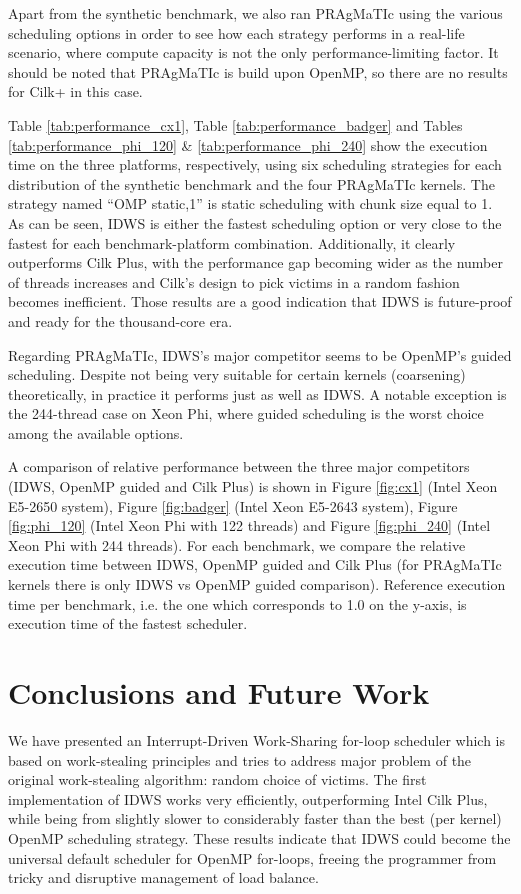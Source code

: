 \documentclass{acm_proc_article-sp}
\newcommand{\PRAGMATIC}{PRAgMaTIc\xspace}
\begin{document}
Apart from the synthetic benchmark, we also ran \PRAGMATIC using the various
scheduling options in order to see how each strategy performs in a real-life
scenario, where compute capacity is not the only performance-limiting factor. It
should be noted that \PRAGMATIC is build upon OpenMP, so there are no results
for Cilk+ in this case.

Table \ref{tab:performance_cx1}, Table \ref{tab:performance_badger} and
Tables \ref{tab:performance_phi_120} \& \ref{tab:performance_phi_240} show the
execution time on the three platforms, respectively, using six scheduling
strategies for each distribution of the synthetic benchmark and the four
\PRAGMATIC kernels. The strategy named ``OMP static,1'' is static scheduling
with chunk size equal to 1. As can be seen, IDWS is either the fastest
scheduling option or very close to the fastest for each benchmark-platform
combination. Additionally, it clearly outperforms Cilk Plus, with the
performance gap becoming wider as the number of threads increases and Cilk's
design to pick victims in a random fashion becomes inefficient. Those results
are a good indication that IDWS is future-proof and ready for the thousand-core
era.

Regarding \PRAGMATIC, IDWS's major competitor seems to be OpenMP's guided
scheduling. Despite not being very suitable for certain kernels (coarsening)
theoretically, in practice it performs just as well as IDWS. A notable exception
is the 244-thread case on Xeon Phi, where guided scheduling is the worst choice
among the available options.

A comparison of relative performance between the three major competitors (IDWS,
OpenMP guided and Cilk Plus) is shown in Figure \ref{fig:cx1} (Intel Xeon
E5-2650 system), Figure \ref{fig:badger} (Intel Xeon E5-2643 system), Figure
\ref{fig:phi_120} (Intel Xeon Phi with 122 threads) and Figure
\ref{fig:phi_240} (Intel Xeon Phi with 244 threads). For each benchmark, we
compare the relative execution time between IDWS, OpenMP guided and Cilk Plus
(for \PRAGMATIC kernels there is only IDWS vs OpenMP guided comparison).
Reference execution time per benchmark, i.e. the one which corresponds to 1.0 on
the y-axis, is execution time of the fastest scheduler.


\section{Conclusions and Future Work}
\label{sect:conclusions}
We have presented an Interrupt-Driven Work-Sharing for-loop scheduler which is
based on work-stealing principles and tries to address major problem of the
original work-stealing algorithm: random choice of victims. The first
implementation of IDWS works very efficiently, outperforming Intel Cilk Plus,
while being from slightly slower to considerably faster than the best (per
kernel) OpenMP scheduling strategy. These results indicate that IDWS could
become the universal default scheduler for OpenMP for-loops, freeing the
programmer from tricky and disruptive management of load balance.
\end{document}
